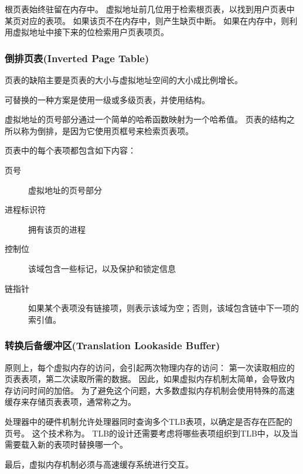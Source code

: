{{        根页表始终驻留在内存中。
        虚拟地址前几位用于检索根页表，以找到用户页表中某页对应的表项。
        如果该页不在内存中，则产生缺页中断。
        如果在内存中，则利用虚拟地址中接下来的位检索用户页表项页。

        \subsubsection{倒排页表(Inverted Page Table)}
        {
            页表的缺陷主要是页表的大小与虚拟地址空间的大小成比例增长。

            可替换的一种方案是使用一级或多级页表，并使用结构。

            虚拟地址的页号部分通过一个简单的哈希函数映射为一个哈希值。
            页表的结构之所以称为倒排，是因为它使用页框号来检索页表项。

            页表中的每个表项都包含如下内容：

            \begin{description}
                \item[页号] 虚拟地址的页号部分
                \item[进程标识符] 拥有该页的进程
                \item[控制位] 该域包含一些标记，以及保护和锁定信息
                \item[链指针] 如果某个表项没有链接项，则表示该域为空；否则，该域包含链中下一项的索引值。
            \end{description}
        }

        \subsubsection{转换后备缓冲区(Translation Lookaside Buffer)}
        {
            原则上，每个虚拟内存的访问，会引起两次物理内存的访问：
            第一次读取相应的页表表项，第二次读取所需的数据。
            因此，如果虚拟内存机制太简单，会导致内存访问时间的加倍。
            为了避免这个问题，大多数虚拟内存机制会使用特殊的高速缓存来存储页表表项，通常称之为。

            处理器中的硬件机制允许处理器同时查询多个TLB表项，以确定是否存在匹配的页号。
            这个技术称为。
            TLB的设计还需要考虑将哪些表项组织到TLB中，以及当需要载入新的表项时替换哪一个。

            最后，虚拟内存机制必须与高速缓存系统进行交互。
        }

}}
